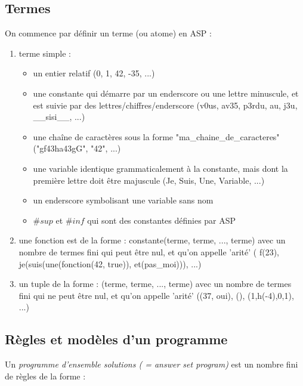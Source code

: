 \documentclass[12pt,a4paper]{article}
\begin{document}
\subsection{Termes}
On commence par définir un terme (ou atome) en ASP :
\begin{enumerate}
	\item terme simple :
		\begin{itemize}
		\item un entier relatif (0, 1, 42, -35, ...)
		\item une constante qui démarre par un enderscore ou une lettre minuscule, et est suivie par des lettres/chiffres/enderscore (v0us, av35, p3rdu, au, j3u, \_\_sisi\_\_, ...)
		\item une chaîne de caractères sous la forme "ma\_chaine\_de\_caracteres" ("gf43ha43gG", "42", ...)
		\item une variable identique grammaticalement à la constante, mais dont la première lettre doit être majuscule (Je, Suis, Une, Variable, ...)
		\item un enderscore symbolisant une variable sans nom
		\item $\#sup$ et $\#inf$ qui sont des constantes définies par ASP
		\end{itemize}
	\item une fonction est de la forme : constante(terme, terme, ..., terme) avec un nombre de termes fini qui peut être nul, et qu'on appelle 'arité' ( f(23), je(suis(une(fonction(42, true)), et(pas\_moi))), ...)
	\item un tuple de la forme : (terme, terme, ..., terme) avec un nombre de termes fini qui ne peut être nul, et qu'on appelle 'arité' ((37, oui), (), (1,h(-4),0,1), ...)
\end{enumerate}
\subsection{Règles et modèles d'un programme}
Un \emph{programme d'ensemble solutions ( = answer set program)} est un nombre fini de règles de la forme :
\end{document}
